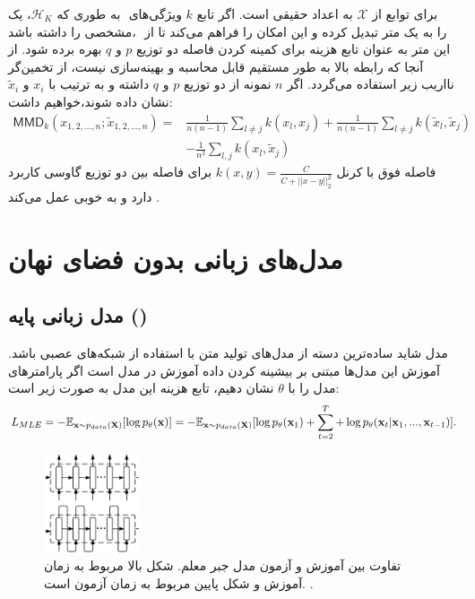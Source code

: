 به طوری که $‎\mathcal{H}‎_K$، یک  ‎‎ برای توابع از $‎\mathcal{X}‎$ به اعداد حقیقی است. اگر تابع $k$ ویژگی‌های مشخصی را داشته باشد، ‎\mmd{}‎ را به یک متر تبدیل کرده و این امکان را فراهم می‌کند تا از این متر به عنوان تابع هزینه برای کمینه کردن فاصله دو توزیع $p$  و $q$  بهره برده شود. از آنجا که رابطه بالا به طور مستقیم قابل محاسبه و بهینه‌سازی نیست، از تخمین‌گر نااریب زیر استفاده می‌گردد. اگر $n$ نمونه از دو توزیع $p$ و $q$ داشته و به ترتیب با $x_i$ و $‎\tilde{x}_i$ نشان داده شوند،‌خواهیم داشت:
\begin{align}
	\mathsf{MMD}_k(x_{1,2,...,n};\tilde{x}_{1,2,...,n}) = & \frac{1}{n(n-1)} \sum_{l \neq j} k(x_l, x_j) +
	\frac{1}{n(n-1)} \sum_{l \neq j} k(\tilde{x}_l, \tilde{x}_j)                            \nonumber         \\
	                                                      & - \frac{1}{n ^ 2} \sum_{l, j} k(x_l, \tilde{x}_j)
\end{align}
فاصله فوق با کرنل
$k(x, y) = \frac{C}{C + ||x - y||^2_2}$
برای فاصله بین دو توزیع گاوسی کاربرد دارد و به خوبی عمل می‌کند \cite{wae}.

\section{مدل‌های زبانی بدون فضای نهان}
\subsection{مدل زبانی پایه (\teacherforcing{})}
مدل  شاید ساده‌ترین دسته از مدل‌های تولید متن با استفاده از شبکه‌های عصبی باشد. آموزش این مدل‌ها مبتنی بر بیشینه کردن  داده آموزش در مدل است \cite{teacher_force} اگر پارامترهای مدل را با $‎\theta$ نشان دهیم، تابع هزینه این مدل به صورت زیر است:
\begin{equation}\begin{split}
		L_{MLE} = -\mathbb E_{{\bf x} \sim p_{data}({\bf X})} [\log p_\theta ({\bf x})] = -\mathbb E_{{\bf x} \sim p_{data}({\bf X})} [\log p_\theta ({\bf x}_1) + \sum_{t=2}^{T}  +\log p_\theta ({\bf x}_t|{\bf x}_1, ..., {\bf x}_{t-1})].
	\end{split}\end{equation}

\begin{figure}[H]
	\centering
	\includegraphics[width=0.25\textwidth]{images/teach-prof.png}
	\caption{
		تفاوت بین آموزش و آزمون مد‌ل جبر معلم. شکل بالا مربوط به زمان آموزش و شکل پایین مربوط به زمان آزمون است. \cite{prof_force}.}
	\label{fig:chap2:expbias}
\end{figure}

